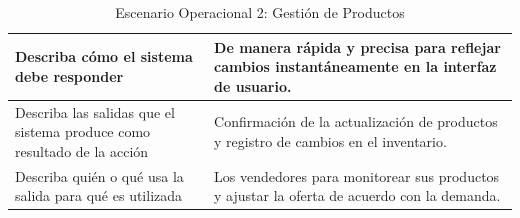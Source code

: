 \documentclass[12pt]{article}
\begin{document}
\begin{table}[H]
\begin{tabular}{|p{4cm}|p{4cm}|p{4cm}|p{4cm}|}
        \multicolumn{1}{|p{4cm}|}{\cellcolor{teal!50}Describa cómo el sistema debe responder} & \multicolumn{3}{p{12cm}|}{De manera rápida y precisa para reflejar cambios instantáneamente en la interfaz de usuario.} \\ \hline
        \multicolumn{1}{|p{4cm}|}{\cellcolor{teal!50}Describa las salidas que el sistema produce como resultado de la acción} & \multicolumn{3}{p{12cm}|}{Confirmación de la actualización de productos y registro de cambios en el inventario.} \\ \hline
        \multicolumn{1}{|p{4cm}|}{\cellcolor{teal!50}Describa quién o qué usa la salida para qué es utilizada} & \multicolumn{3}{p{12cm}|}{Los vendedores para monitorear sus productos y ajustar la oferta de acuerdo con la demanda.} \\ \hline
    \end{tabular}
    \caption{Escenario Operacional 2: Gestión de Productos}
    \label{tab:escenario_operacional_2}
\end{table}
\end{document}

